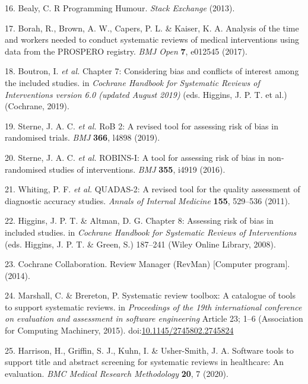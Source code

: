 \documentclass[a4paper, nobind]{templates/ociamthesis}
\begin{document}
\leavevmode\hypertarget{ref-bealy2013}{}%
16. Bealy, C. R Programming Humour. \emph{Stack Exchange} (2013).

\leavevmode\hypertarget{ref-borah2017}{}%
17. Borah, R., Brown, A. W., Capers, P. L. \& Kaiser, K. A. Analysis of the time and workers needed to conduct systematic reviews of medical interventions using data from the PROSPERO registry. \emph{BMJ Open} \textbf{7}, e012545 (2017).

\leavevmode\hypertarget{ref-cochranechpt7}{}%
18. Boutron, I. \emph{et al.} Chapter 7: Considering bias and conflicts of interest among the included studies. in \emph{Cochrane Handbook for Systematic Reviews of Interventions version 6.0 (updated August 2019)} (eds. Higgins, J. P. T. et al.) (Cochrane, 2019).

\leavevmode\hypertarget{ref-sterne2019rob}{}%
19. Sterne, J. A. C. \emph{et al.} RoB 2: A revised tool for assessing risk of bias in randomised trials. \emph{BMJ} \textbf{366}, l4898 (2019).

\leavevmode\hypertarget{ref-sterne2016robins}{}%
20. Sterne, J. A. C. \emph{et al.} ROBINS-I: A tool for assessing risk of bias in non-randomised studies of interventions. \emph{BMJ} \textbf{355}, i4919 (2016).

\leavevmode\hypertarget{ref-whiting2011quadas}{}%
21. Whiting, P. F. \emph{et al.} QUADAS-2: A revised tool for the quality assessment of diagnostic accuracy studies. \emph{Annals of Internal Medicine} \textbf{155}, 529--536 (2011).

\leavevmode\hypertarget{ref-higgins2008assessing}{}%
22. Higgins, J. P. T. \& Altman, D. G. Chapter 8: Assessing risk of bias in included studies. in \emph{Cochrane Handbook for Systematic Reviews of Interventions} (eds. Higgins, J. P. T. \& Green, S.) 187--241 (Wiley Online Library, 2008).

\leavevmode\hypertarget{ref-cochrane2014review}{}%
23. Cochrane Collaboration. Review Manager (RevMan) {[}Computer program{]}. (2014).

\leavevmode\hypertarget{ref-marshall2015systematic}{}%
24. Marshall, C. \& Brereton, P. Systematic review toolbox: A catalogue of tools to support systematic reviews. in \emph{Proceedings of the 19th international conference on evaluation and assessment in software engineering} Article 23; 1--6 (Association for Computing Machinery, 2015). doi:\href{https://doi.org/10.1145/2745802.2745824}{10.1145/2745802.2745824}

\leavevmode\hypertarget{ref-harrison2020software}{}%
25. Harrison, H., Griffin, S. J., Kuhn, I. \& Usher-Smith, J. A. Software tools to support title and abstract screening for systematic reviews in healthcare: An evaluation. \emph{BMC Medical Research Methodology} \textbf{20}, 7 (2020).
\end{document}

